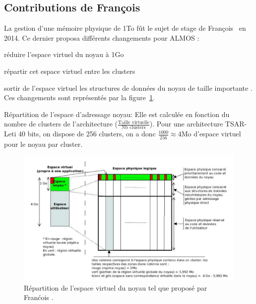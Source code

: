       
    \subsection{Contributions de François \citeauthor{guerret2014exploitation}}
      
      La gestion d'une mémoire physique de 1To fût le sujet de stage de
      François~\citet{guerret2014exploitation} en 2014. Ce dernier proposa
      différents changements pour ALMOS : \benumline \item réduire l'espace
      virtuel du noyau à 1Go \item répartir cet espace virtuel entre les
      clusters \item sortir de l'espace virtuel les structures de données du
      noyau de taille importante \eenumline. Ces changements sont représentés
      par la figure~\ref{fig:almos-guerret}.

      \begin{paragraph}{Répartition de l'espace d'adressage noyau:}
        Elle est calculée en fonction du nombre de clusters de l'architecture
        ($\frac{\text{Taille virtuelle}}{\text{Nb clusters}}$). Pour une
        architecture TSAR-Leti 40 bits, on dispose de 256 clusters, on a donc
        $\frac{1000}{256}\approx4$Mo d'espace virtuel pour le noyau par cluster.
      \end{paragraph}

      \begin{figure}[ht]
        \centering \includegraphics[scale=0.8]{include/img/almos-guerret}
        \caption{Répartition de l'espace virtuel du noyau tel que proposé par
          Franćois \citet{guerret2014exploitation}.}
        \label{fig:almos-guerret}
      \end{figure}

